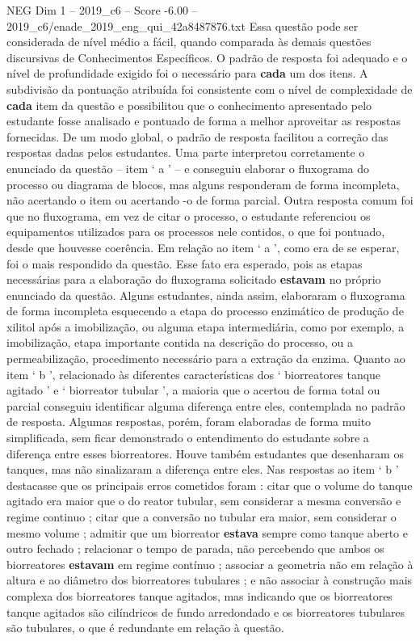\begin{textsample}{NEG Dim 1 – 2019\_c6 – Score -6.00 – 2019\_c6/enade\_2019\_eng\_qui\_42a8487876.txt}
Essa questão pode ser considerada de nível médio a fácil, quando comparada às demais questões discursivas de Conhecimentos Específicos.
O padrão de resposta foi adequado e o nível de profundidade exigido foi o necessário para \textbf{cada} um dos itens.
A subdivisão da pontuação atribuída foi consistente com o nível de complexidade de \textbf{cada} item da questão e possibilitou que o conhecimento apresentado pelo estudante fosse analisado e pontuado de forma a melhor aproveitar as respostas fornecidas.
De um modo global, o padrão de resposta facilitou a correção das respostas dadas pelos estudantes.
Uma parte interpretou corretamente o enunciado da questão – item ‘ a ’ – e conseguiu elaborar o fluxograma do processo ou diagrama de blocos, mas alguns responderam de forma incompleta, não acertando o item ou acertando -o de forma parcial.
Outra resposta comum foi que no fluxograma, em vez de citar o processo, o estudante referenciou os equipamentos utilizados para os processos nele contidos, o que foi pontuado, desde que houvesse coerência.
Em relação ao item ‘ a ’, como era de se esperar, foi o mais respondido da questão.
Esse fato era esperado, pois as etapas necessárias para a elaboração do fluxograma solicitado \textbf{estavam} no próprio enunciado da questão.
Alguns estudantes, ainda assim, elaboraram o fluxograma de forma incompleta esquecendo a etapa do processo enzimático de produção de xilitol após a imobilização, ou alguma etapa intermediária, como por exemplo, a imobilização, etapa importante contida na descrição do processo, ou a permeabilização, procedimento necessário para a extração da enzima.
Quanto ao item ‘ b ’, relacionado às diferentes características dos ‘ biorreatores tanque agitado ’ e ‘ biorreator tubular ’, a maioria que o acertou de forma total ou parcial conseguiu identificar alguma diferença entre eles, contemplada no padrão de resposta.
Algumas respostas, porém, foram elaboradas de forma muito simplificada, sem ficar demonstrado o entendimento do estudante sobre a diferença entre esses biorreatores.
Houve também estudantes que desenharam os tanques, mas não sinalizaram a diferença entre eles.
Nas respostas ao item ‘ b ’ destacasse que os principais erros cometidos foram : citar que o volume do tanque agitado era maior que o do reator tubular, sem considerar a mesma conversão e regime continuo ; citar que a conversão no tubular era maior, sem considerar o mesmo volume ; admitir que um biorreator \textbf{estava} sempre como tanque aberto e outro fechado ; relacionar o tempo de parada, não percebendo que ambos os biorreatores \textbf{estavam} em regime contínuo ; associar a geometria não em relação à altura e ao diâmetro dos biorreatores tubulares ; e não associar à construção mais complexa dos biorreatores tanque agitados, mas indicando que os biorreatores tanque agitados são cilíndricos de fundo arredondado e os biorreatores tubulares são tubulares, o que é redundante em relação à questão.

\end{textsample}
